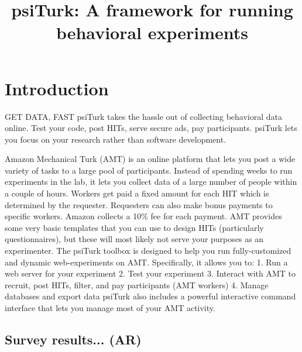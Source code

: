\documentclass[jou,apacite]{apa6}
\title{psiTurk: A framework for running behavioral experiments}
\begin{document}
\maketitle
\section{Introduction}
GET DATA, FAST
psiTurk takes the hassle out of collecting behavioral data online.
Test your code, post HITs, serve secure ads, pay participants.
psiTurk lets you focus on your research rather than software development.

Amazon Mechanical Turk (AMT) is an online platform that lets you post a wide variety of tasks to a large pool of participants.
Instead of spending weeks to run experiments in the lab, it lets you collect data of a large number of people within a couple of hours.
Workers get paid a fixed amount for each HIT which is determined by the requester.
Requesters can also make bonus payments to specific workers. Amazon collects a 10\% fee for each payment.
AMT provides some very basic templates that you can use to design HITs (particularly questionnaires), but these will most likely not serve your purposes as an experimenter.
The psiTurk toolbox is designed to help you run fully-customized and dynamic web-experiments on AMT.
Specifically, it allows you to:
1. Run a web server for your experiment
2. Test your experiment
3. Interact with AMT to recruit, post HITs, filter, and pay participants (AMT workers)
4. Manage databases and export data
psiTurk also includes a powerful interactive command interface that lets you manage most of your AMT activity.

\subsection{Survey results... (AR)}
\end{document}
